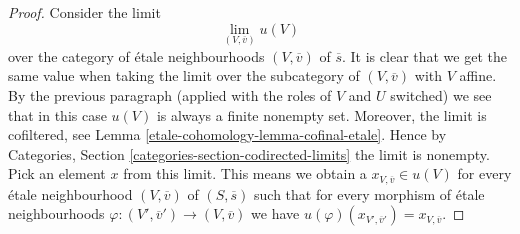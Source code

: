 \begin{proof}
\medskip\noindent
Consider the limit
$$
\lim_{(V, \overline{v})} u(V)
$$
over the category of \'etale neighbourhoods $(V, \overline{v})$ of
$\overline{s}$. It is clear that we get the same value when taking
the limit over the subcategory of $(V, \overline{v})$ with $V$ affine.
By the previous paragraph (applied with the roles of $V$ and $U$ switched)
we see that in this case $u(V)$ is always a finite nonempty set.
Moreover, the limit is cofiltered, see
Lemma \ref{etale-cohomology-lemma-cofinal-etale}.
Hence by
Categories, Section \ref{categories-section-codirected-limits}
the limit is nonempty. Pick an element $x$ from this limit.
This means we obtain a $x_{V, \overline{v}} \in u(V)$ for
every \'etale neighbourhood $(V, \overline{v})$ of $(S, \overline{s})$
such that for every morphism of \'etale neighbourhoods
$\varphi : (V', \overline{v}') \to (V, \overline{v})$ we have
$u(\varphi)(x_{V', \overline{v}'}) = x_{V, \overline{v}}$.


\end{proof}
